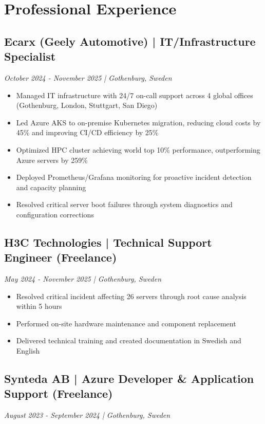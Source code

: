 \documentclass[11pt,a4paper]{article}
\begin{document}
\section*{Professional Experience}

\subsection*{Ecarx (Geely Automotive) | IT/Infrastructure Specialist}
\textit{October 2024 - November 2025 | Gothenburg, Sweden}

\begin{itemize}[leftmargin=*, itemsep=2pt]
\item Managed IT infrastructure with 24/7 on-call support across 4 global offices (Gothenburg, London, Stuttgart, San Diego)
\item Led Azure AKS to on-premise Kubernetes migration, reducing cloud costs by 45\% and improving CI/CD efficiency by 25\%
\item Optimized HPC cluster achieving world top 10\% performance, outperforming Azure servers by 259\%
\item Deployed Prometheus/Grafana monitoring for proactive incident detection and capacity planning
\item Resolved critical server boot failures through system diagnostics and configuration corrections
\end{itemize}

\subsection*{H3C Technologies | Technical Support Engineer (Freelance)}
\textit{May 2024 - November 2025 | Gothenburg, Sweden}

\begin{itemize}[leftmargin=*, itemsep=2pt]
\item Resolved critical incident affecting 26 servers through root cause analysis within 5 hours
\item Performed on-site hardware maintenance and component replacement
\item Delivered technical training and created documentation in Swedish and English
\end{itemize}

\subsection*{Synteda AB | Azure Developer \& Application Support (Freelance)}
\textit{August 2023 - September 2024 | Gothenburg, Sweden}
\end{document}
